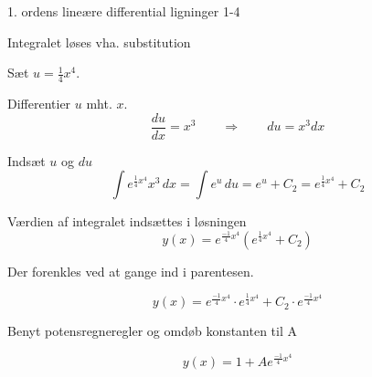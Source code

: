 \documentclass{article}
\begin{document}
\begin{exercise}{1. ordens lineære differential ligninger 1-4}
	\hint
	
	Integralet løses vha. substitution
	
	
	\hint
	Sæt $u = \frac{1}{4}x^4$.
	
	\hint
	
	Differentier $u$ mht. $x$.
	\[
	\frac{du}{dx} = x^3 \qquad	\Rightarrow \qquad du = x^3 dx
	\]
	
	\hint 
	Indsæt $u$ og $du$
	\[
	\int e^{\frac{1}{4}x^4}x^3 \, dx = \int e^{u} \, du = e^{u} + C_2 = e^{\frac{1}{4}x^4} + C_2
	\]
	
	\hint
	
	Værdien af integralet indsættes i løsningen
	\[
	y(x) = e^{\frac{-1}{4}x^4} \left( e^{\frac{1}{4}x^4}+ C_2\right)
	\]
	
	\hint
	
	Der forenkles ved at gange ind i parentesen.
	
	\hint
	\[
	y(x) = e^{\frac{-1}{4}x^4} \cdot e^{\frac{1}{4}x^4} + C_2 \cdot e^{\frac{-1}{4}x^4} 
	\]
	
	\hint
	
	Benyt potensregneregler og omdøb konstanten til A
	
	\hint
	\[
	y(x) = 1 + A e^{\frac{-1}{4}x^4}
	\]
	
	
\end{exercise}

\newpage
\end{document}
